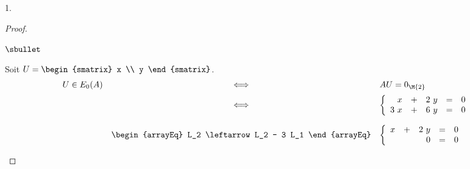 \documentclass[11pt]{article}%
\begin{document}
\begin{noliste}{1.}
\begin{proof}
\begin{noliste}{$\sbullet$}
    \item Soit $U =
      \begin{smatrix}
        x \\
        y
      \end{smatrix}
      $.
      \[
      \begin{array}{rcl}
        U \in E_0(A) & \Longleftrightarrow & AU = 0_{\M{2}}
        \\[.2cm]
        & \Longleftrightarrow & 
        \left\{
          \begin{array}{rcrcl}
            x & + & 2 \ y & = & 0 \\
            3 \ x & + & 6 \ y & = & 0 
          \end{array}
        \right.
        \\[.6cm]
        &
        \begin{arrayEq}
          L_2 \leftarrow L_2 - 3 L_1 
        \end{arrayEq}
        & 
        \left\{
          \begin{array}{rcrcl}
            x & + & 2 \ y & = & 0 \\
            & & 0 & = & 0 
          \end{array}
        \right.
      \end{array}
      \]





\end{noliste}
\end{proof}
\end{noliste}
\end{document}
